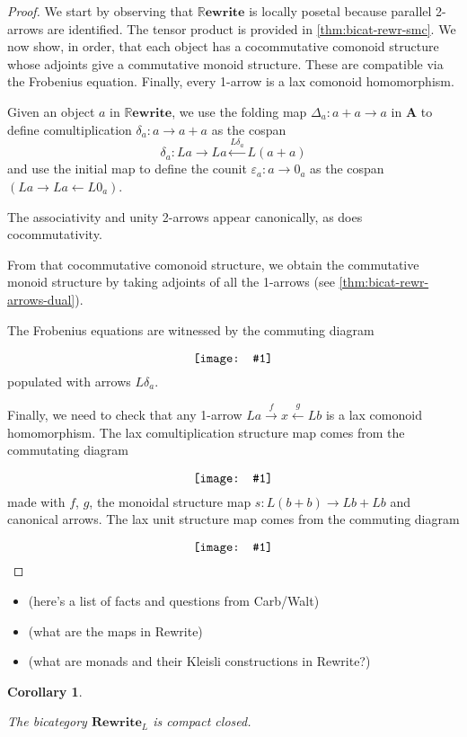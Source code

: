 \documentclass{amsart}
\renewcommand{\epsilon}{\varepsilon}
\newcommand{\A}{\cat{A}}
\newcommand{\cat}[1]{\mathbf{#1}}
\newcommand{\from}{\colon}
\newcommand{\xto}[1]{\xrightarrow{#1}}
\newcommand{\xgets}[1]{\xleftarrow{#1}}
\newcommand{\diagram}[1]{\raisebox{-0.5\height}{\texttt{[image: \#1]}}}
\newcommand{\Rewrite}{\mathbf{Rewrite} }
\newcommand{\RRewrite}{ \mathbb{R}\mathbf{ewrite} }
\newcommand{\edit}[1]{\textcolor{editcolour}{(#1)}}
\newtheorem{corollary}[theorem]{Corollary}
\theoremstyle{remark}
\theoremstyle{definition}
\begin{document}
\begin{proof}

  We start by observing that $ \RRewrite $ is locally posetal because
  parallel 2-arrows are identified. The tensor product is provided in
  \ref{thm:bicat-rewr-smc}. We now show, in order, that each object
  has a cocommutative comonoid structure whose adjoints give a
  commutative monoid structure.  These are compatible via the
  Frobenius equation. Finally, every 1-arrow is a lax comonoid
  homomorphism.
	
  Given an object $ a $ in $ \RRewrite $, we use the folding map
  $ \Delta_{a} \from a + a \to a $ in $ \A $ to define
  comultiplication $ \delta_a \from a \to a + a $ as the cospan
  \[
    \delta_a \from La \to La \xgets{L\delta_a} L(a + a)
  \]
  and use the initial map to define the counit
  $ \epsilon_a \from a \to 0_a $ as the cospan
  \( (La \to La \gets L0_a) \).
  
  The associativity and unity 2-arrows appear canonically, as does
  cocommutativity.
	
  From that cocommutative comonoid structure, we obtain the
  commutative monoid structure by taking adjoints of all the 1-arrows
  (see \ref{thm:bicat-rewr-arrows-dual}).
	
  The Frobenius equations are witnessed by the commuting diagram
  \[
    \diagram{diag_nlr_bi-rewrite-frobenius}
  \]
  populated with arrows $ L \delta_a $.
	
  Finally, we need to check that any 1-arrow
  $ La \xto{f} x \xgets{g} Lb $ is a lax comonoid homomorphism. The
  lax comultiplication structure map comes from the commutating
  diagram
  \[
    \diagram{diag_nlr_bi-rewrite-lax-comul}
  \]
  made with $ f $, $ g $, the monoidal structure map
  $ s \from L(b+b) \to Lb+Lb $ and canonical arrows. The lax unit
  structure map comes from the commuting diagram
  \[
    \diagram{diag_nlr_bi-rewrite-lax-counit} \qedhere
  \]
  
\end{proof}

\begin{itemize}
	\item \edit{here's a list of facts and questions from Carb/Walt}
	\item \edit{what are the maps in Rewrite}
	\item \edit{what are monads and their Kleisli constructions in Rewrite?}
\end{itemize}

\begin{corollary} \label{thm:bit-rewr-comp-closed}
  
  The bicategory $ \Rewrite_L$ is compact closed.
  
\end{corollary}
\end{document}
